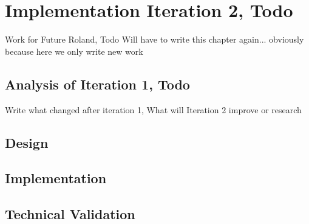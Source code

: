 \section{Implementation Iteration 2, Todo}
Work for Future Roland, Todo
Will have to write this chapter again... obviously because here we only write new work

\subsection{Analysis of Iteration 1, Todo}
Write what changed after iteration 1,
What will Iteration 2 improve or research

\subsection{Design}
\subsection{Implementation}
\subsection{Technical Validation}
